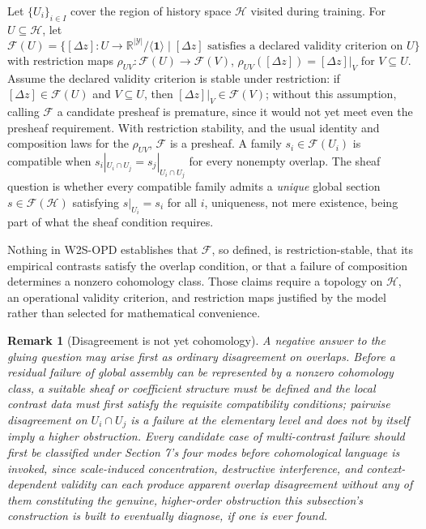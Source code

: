\documentclass[11pt]{article}
\newtheorem{remark}[definition]{Remark}
\begin{document}
Let $\{U_i\}_{i \in I}$ cover the region of history space $\mathcal{H}$ visited during training. For $U \subseteq \mathcal{H}$, let
\[
\mathcal{F}(U) = \Big\{[\Delta z]: U \to \mathbb{R}^{|\mathcal{Y}|}/\langle \mathbf{1}\rangle \;\Big|\; [\Delta z] \text{ satisfies a declared validity criterion on } U\Big\}
\]
with restriction maps $\rho_{UV}: \mathcal{F}(U) \to \mathcal{F}(V)$, $\rho_{UV}([\Delta z]) = [\Delta z]|_V$ for $V \subseteq U$. Assume the declared validity criterion is stable under restriction: if $[\Delta z] \in \mathcal{F}(U)$ and $V \subseteq U$, then $[\Delta z]|_V \in \mathcal{F}(V)$; without this assumption, calling $\mathcal{F}$ a candidate presheaf is premature, since it would not yet meet even the presheaf requirement. With restriction stability, and the usual identity and composition laws for the $\rho_{UV}$, $\mathcal{F}$ is a presheaf. A family $s_i \in \mathcal{F}(U_i)$ is compatible when $s_i|_{U_i \cap U_j} = s_j|_{U_i \cap U_j}$ for every nonempty overlap. The sheaf question is whether every compatible family admits a \emph{unique} global section $s \in \mathcal{F}(\mathcal{H})$ satisfying $s|_{U_i} = s_i$ for all $i$, uniqueness, not mere existence, being part of what the sheaf condition requires.

Nothing in W2S-OPD establishes that $\mathcal{F}$, so defined, is restriction-stable, that its empirical contrasts satisfy the overlap condition, or that a failure of composition determines a nonzero cohomology class. Those claims require a topology on $\mathcal{H}$, an operational validity criterion, and restriction maps justified by the model rather than selected for mathematical convenience.

\begin{remark}[Disagreement is not yet cohomology]
A negative answer to the gluing question may arise first as ordinary disagreement on overlaps. Before a residual failure of global assembly can be represented by a nonzero cohomology class, a suitable sheaf or coefficient structure must be defined and the local contrast data must first satisfy the requisite compatibility conditions; pairwise disagreement on $U_i \cap U_j$ is a failure at the elementary level and does not by itself imply a higher obstruction. Every candidate case of multi-contrast failure should first be classified under Section 7's four modes before cohomological language is invoked, since scale-induced concentration, destructive interference, and context-dependent validity can each produce apparent overlap disagreement without any of them constituting the genuine, higher-order obstruction this subsection's construction is built to eventually diagnose, if one is ever found.
\end{remark}
\end{document}
